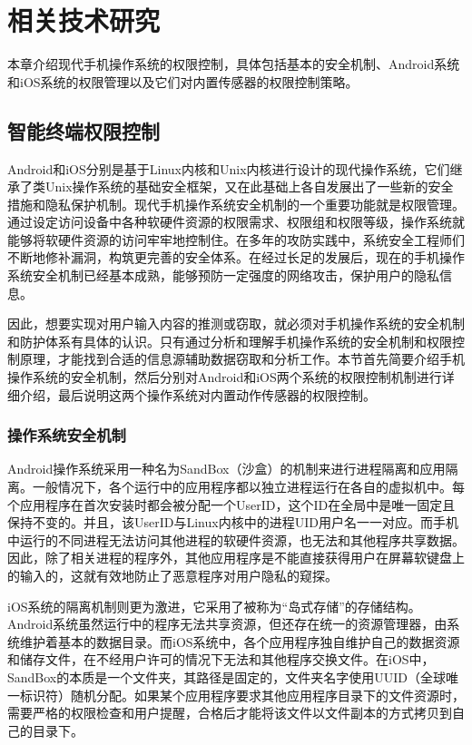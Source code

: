 \chapter{相关技术研究}
	
	本章介绍现代手机操作系统的权限控制，具体包括基本的安全机制、Android系统和iOS系统的权限管理以及它们对内置传感器的权限控制策略。

	\section{智能终端权限控制}
		
		Android和iOS分别是基于Linux内核和Unix内核进行设计的现代操作系统，它们继承了类Unix操作系统的基础安全框架，又在此基础上各自发展出了一些新的安全措施和隐私保护机制。现代手机操作系统安全机制的一个重要功能就是权限管理。通过设定访问设备中各种软硬件资源的权限需求、权限组和权限等级，操作系统就能够将软硬件资源的访问牢牢地控制住。在多年的攻防实践中，系统安全工程师们不断地修补漏洞，构筑更完善的安全体系。在经过长足的发展后，现在的手机操作系统安全机制已经基本成熟，能够预防一定强度的网络攻击，保护用户的隐私信息。
		
		因此，想要实现对用户输入内容的推测或窃取，就必须对手机操作系统的安全机制和防护体系有具体的认识。只有通过分析和理解手机操作系统的安全机制和权限控制原理，才能找到合适的信息源辅助数据窃取和分析工作。本节首先简要介绍手机操作系统的安全机制，然后分别对Android和iOS两个系统的权限控制机制进行详细介绍，最后说明这两个操作系统对内置动作传感器的权限控制。
		
		\subsection{操作系统安全机制}
		
			Android操作系统采用一种名为SandBox（沙盒）的机制来进行进程隔离和应用隔离。一般情况下，各个运行中的应用程序都以独立进程运行在各自的虚拟机中。每个应用程序在首次安装时都会被分配一个UserID，这个ID在全局中是唯一固定且保持不变的。并且，该UserID与Linux内核中的进程UID用户名一一对应。而手机中运行的不同进程无法访问其他进程的软硬件资源，也无法和其他程序共享数据。因此，除了相关进程的程序外，其他应用程序是不能直接获得用户在屏幕软键盘上的输入的，这就有效地防止了恶意程序对用户隐私的窥探。
			
			iOS系统的隔离机制则更为激进，它采用了被称为“岛式存储”的存储结构。Android系统虽然运行中的程序无法共享资源，但还存在统一的资源管理器，由系统维护着基本的数据目录。而iOS系统中，各个应用程序独自维护自己的数据资源和储存文件，在不经用户许可的情况下无法和其他程序交换文件。在iOS中，SandBox的本质是一个文件夹，其路径是固定的，文件夹名字使用UUID（全球唯一标识符）随机分配。如果某个应用程序要求其他应用程序目录下的文件资源时，需要严格的权限检查和用户提醒，合格后才能将该文件以文件副本的方式拷贝到自己的目录下。
			
